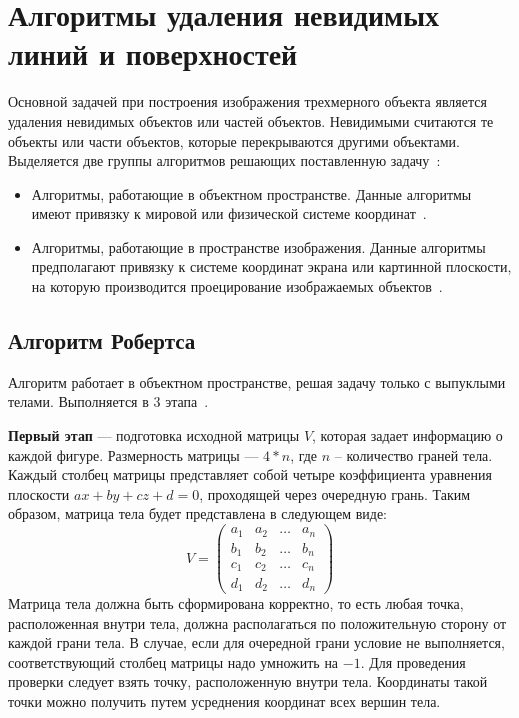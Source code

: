 \documentclass[a4paper, 14pt]{extreport}
\begin{document}
\clearpage\section{Алгоритмы удаления невидимых линий и поверхностей}

Основной задачей при построения изображения трехмерного объекта является удаления невидимых объектов или частей
объектов. Невидимыми считаются те объекты или части объектов, которые перекрываются другими объектами. Выделяется
две группы алгоритмов решающих поставленную задачу~\cite{rodjers}:
\begin{itemize}
	\item Алгоритмы, работающие в объектном пространстве. Данные алгоритмы имеют привязку к мировой или физической 
	системе координат~\cite{rodjers}.
	\item Алгоритмы, работающие в пространстве изображения. Данные алгоритмы предполагают привязку к системе 	
	координат экрана или картинной плоскости, на которую производится проецирование изображаемых 
	объектов~\cite{rodjers}.
\end{itemize}

\subsection{Алгоритм Робертса}

Алгоритм работает в объектном пространстве, решая задачу только с выпуклыми телами. Выполняется в 3 этапа~\cite{rodjers}. 

\textbf{Первый этап} --- подготовка исходной матрицы $V$, которая задает информацию о каждой фигуре. 
Размерность матрицы --- $4 * n$, где $n$ -- количество граней тела. Каждый столбец матрицы представляет собой четыре 
коэффициента уравнения плоскости $ax + by + cz + d = 0$, проходящей через очередную грань.
Таким образом, матрица тела будет представлена в следующем виде:
\begin{equation}
	V = \begin{pmatrix}
		a_{1} & a_{2} & \ldots & a_{n}\\
		b_{1} & b_{2} & \ldots & b_{n}\\
		c_{1} & c_{2} & \ldots & c_{n}\\
		d_{1} & d_{2} & \ldots & d_{n}
	\end{pmatrix}
\end{equation}
Матрица тела должна быть сформирована корректно, то есть любая точка, расположенная внутри тела, должна располагаться 
по положительную сторону от каждой грани тела. В случае, если для очередной грани условие не выполняется, 
соответствующий столбец матрицы надо умножить на $-1$.  Для проведения проверки следует взять точку, расположенную 
внутри тела. Координаты такой точки можно получить путем усреднения координат всех вершин тела.
\end{document}
